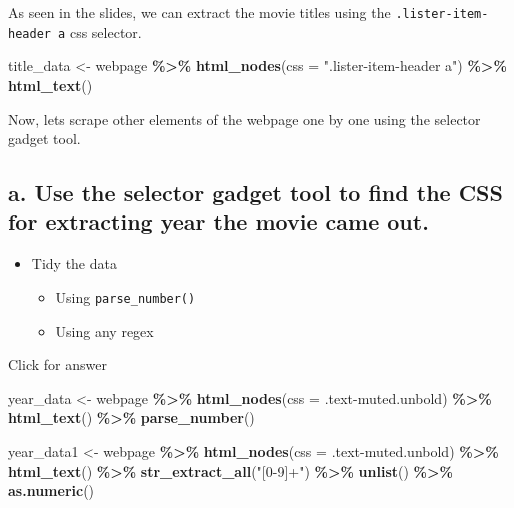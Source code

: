 \documentclass[
]{book}
\newenvironment{Shaded}{\begin{snugshade}}{\end{snugshade}}
\newcommand{\AttributeTok}[1]{\textcolor[rgb]{0.13,0.29,0.53}{#1}}
\newcommand{\FunctionTok}[1]{\textcolor[rgb]{0.13,0.29,0.53}{\textbf{#1}}}
\newcommand{\NormalTok}[1]{#1}
\newcommand{\OtherTok}[1]{\textcolor[rgb]{0.56,0.35,0.01}{#1}}
\newcommand{\SpecialCharTok}[1]{\textcolor[rgb]{0.81,0.36,0.00}{\textbf{#1}}}
\newcommand{\StringTok}[1]{\textcolor[rgb]{0.31,0.60,0.02}{#1}}
\providecommand{\tightlist}{%
  \setlength{\itemsep}{0pt}\setlength{\parskip}{0pt}}
\begin{document}
As seen in the slides, we can extract the movie titles using the \texttt{.lister-item-header\ a} css selector.

\begin{Shaded}
\begin{Highlighting}[]
\NormalTok{title\_data }\OtherTok{\textless{}{-}}\NormalTok{ webpage }\SpecialCharTok{\%\textgreater{}\%} 
  \FunctionTok{html\_nodes}\NormalTok{(}\AttributeTok{css =} \StringTok{".lister{-}item{-}header a"}\NormalTok{) }\SpecialCharTok{\%\textgreater{}\%} 
  \FunctionTok{html\_text}\NormalTok{()}
\end{Highlighting}
\end{Shaded}

Now, lets scrape other elements of the webpage one by one using the selector gadget tool.

\hypertarget{a.-use-the-selector-gadget-tool-to-find-the-css-for-extracting-year-the-movie-came-out.}{%
\subsection{a. Use the selector gadget tool to find the CSS for extracting year the movie came out.}\label{a.-use-the-selector-gadget-tool-to-find-the-css-for-extracting-year-the-movie-came-out.}}

\begin{itemize}
\tightlist
\item
  Tidy the data

  \begin{itemize}
  \tightlist
  \item
    Using \texttt{parse\_number()}
  \item
    Using any regex
  \end{itemize}
\end{itemize}

Click for answer

\begin{Shaded}
\begin{Highlighting}[]
\NormalTok{year\_data }\OtherTok{\textless{}{-}}\NormalTok{ webpage }\SpecialCharTok{\%\textgreater{}\%} 
  \FunctionTok{html\_nodes}\NormalTok{(}\AttributeTok{css =} \StringTok{\textquotesingle{}.text{-}muted.unbold\textquotesingle{}}\NormalTok{) }\SpecialCharTok{\%\textgreater{}\%} 
  \FunctionTok{html\_text}\NormalTok{() }\SpecialCharTok{\%\textgreater{}\%}
  \FunctionTok{parse\_number}\NormalTok{()}

\NormalTok{year\_data1 }\OtherTok{\textless{}{-}}\NormalTok{ webpage }\SpecialCharTok{\%\textgreater{}\%} 
  \FunctionTok{html\_nodes}\NormalTok{(}\AttributeTok{css =} \StringTok{\textquotesingle{}.text{-}muted.unbold\textquotesingle{}}\NormalTok{) }\SpecialCharTok{\%\textgreater{}\%} 
  \FunctionTok{html\_text}\NormalTok{() }\SpecialCharTok{\%\textgreater{}\%} 
  \FunctionTok{str\_extract\_all}\NormalTok{(}\StringTok{"[0{-}9]+"}\NormalTok{) }\SpecialCharTok{\%\textgreater{}\%} 
  \FunctionTok{unlist}\NormalTok{() }\SpecialCharTok{\%\textgreater{}\%} 
  \FunctionTok{as.numeric}\NormalTok{()}
\end{Highlighting}
\end{Shaded}
\end{document}
